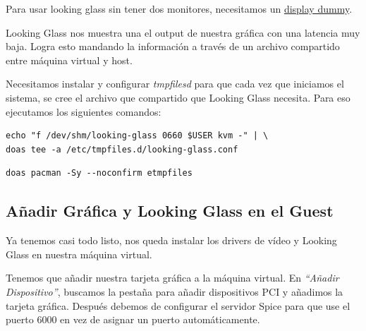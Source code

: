 \documentclass[11pt]{article}
\begin{document}
Para usar looking glass sin tener dos monitores, necesitamos un \href{https://www.amazon.com/s?k=display+dummy}{display dummy}.

\medskip
Looking Glass nos muestra una el output de nuestra gráfica con una latencia muy baja. Logra esto mandando la información a través de un archivo compartido entre máquina virtual y host.

Necesitamos instalar y configurar \emph{tmpfilesd} para que cada vez que iniciamos el sistema, se cree el archivo que compartido que Looking Glass necesita. Para eso ejecutamos los siguientes comandos:

\begin{verbatim}
echo "f /dev/shm/looking-glass 0660 $USER kvm -" | \
doas tee -a /etc/tmpfiles.d/looking-glass.conf
\end{verbatim}
\begin{verbatim}
doas pacman -Sy --noconfirm etmpfiles
\end{verbatim}

\subsection{Añadir Gráfica y Looking Glass en el Guest}

Ya tenemos casi todo listo, nos queda instalar los drivers de vídeo y Looking Glass en nuestra máquina virtual.

\medskip
Tenemos que añadir nuestra tarjeta gráfica a la máquina virtual. En \emph{``Añadir Dispositivo''}, buscamos la pestaña para añadir dispositivos PCI y añadimos la tarjeta gráfica.
Después debemos de configurar el servidor Spice para que use el puerto 6000 en vez de asignar un puerto automáticamente.
\end{document}
